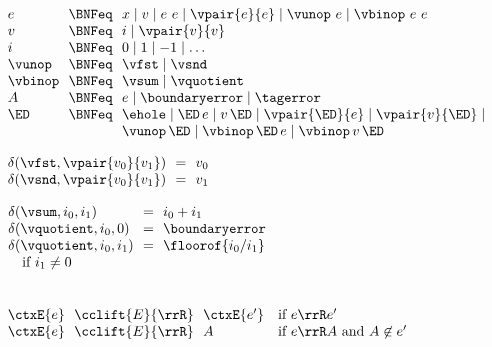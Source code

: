 \begin{flushleft}

\\
$\begin{array}{l@{~~}c@{~~}l}
  e & \BNFeq & x \mid v \mid e~e \mid \vpair{e}{e} \mid \vunop~e \mid \vbinop~e~e
\\
  v & \BNFeq & i \mid \vpair{v}{v}
\\
  i & \BNFeq & 0 \mid 1 \mid -1 \mid \ldots
\\
  \vunop & \BNFeq & \vfst \mid \vsnd
\\
  \vbinop & \BNFeq & \vsum \mid \vquotient
\\
  A & \BNFeq & e \mid \boundaryerror \mid \tagerror
\\
  \ED & \BNFeq & \ehole \mid \ED\,e \mid v\,\ED \mid \vpair{\ED}{e} \mid \vpair{v}{\ED} \mid
\\ & & \vunop\,\ED \mid \vbinop\,\ED\,e \mid \vbinop\,v\,\ED
\end{array}$

\medskip
\begin{minipage}[t]{0.38\columnwidth}
$\begin{array}{l@{~~}c@{~~}l}
  \delta(\vfst, \vpair{v_0}{v_1}) & = & v_0
\\
  \delta(\vsnd, \vpair{v_0}{v_1}) & = & v_1
\end{array}$
\end{minipage}%
\begin{minipage}[t]{0.5\columnwidth}
$\begin{array}{l@{~~}c@{~~}l}
  \delta(\vsum, i_0, i_1) & = & i_0 + i_1
\\
  \delta(\vquotient, i_0, 0) & = & \boundaryerror
\\
  \delta(\vquotient, i_0, i_1) & = & \floorof{i_0 / i_1}
\\ \multicolumn{3}{l}{\mbox{\quad if $i_1 \neq 0$}}
\end{array}$
\end{minipage}

\\
$\begin{array}{l@{~~}c@{~~}l l}
\ctxE{e} & \cclift{E}{\rrR} & \ctxE{e'} & \mbox{if $e \rrR e'$}
\\
\ctxE{e} & \cclift{E}{\rrR} & A         & \mbox{if $e \rrR A$ and $A \not\in e'$}
\end{array}$

\end{flushleft}
